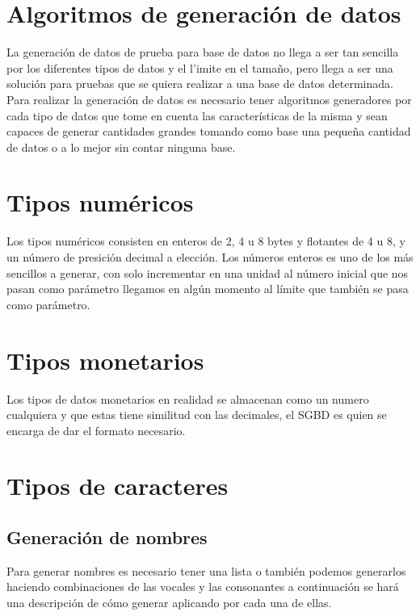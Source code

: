 \section{Algoritmos de generaci\'on de datos}
La generaci\'on de datos de prueba para base de datos no llega a ser tan sencilla por los diferentes tipos de datos y el l'imite en el tama\~no, pero llega a ser una soluci\'on  para pruebas que se quiera realizar a una base de datos determinada. Para realizar la generaci\'on de datos  es necesario tener algoritmos generadores por cada tipo de datos que tome en cuenta las caracter\'isticas de la misma  y sean capaces de generar cantidades grandes tomando como base una peque\~na cantidad de datos o a lo mejor sin contar ninguna base.
\section{Tipos num\'ericos}
Los tipos num\'ericos consisten en enteros de 2, 4 u 8 bytes y flotantes de 4 u 8, y un n\'umero de presici\'on decimal a elecci\'on.
Los n\'umeros enteros es uno de los m\'as sencillos a generar, con solo incrementar en una unidad al n\'umero  inicial que nos pasan como par\'ametro llegamos en alg\'un momento al l\'imite que tambi\'en se pasa como par\'ametro.
\section{Tipos monetarios}
Los tipos de datos monetarios en realidad se almacenan como un numero cualquiera y que estas tiene similitud con las decimales, el SGBD es quien se encarga de dar el formato necesario. 
\section{Tipos de caracteres}
\subsection{Generaci\'on de nombres}
Para generar nombres es necesario tener una lista o tambi\'en podemos generarlos haciendo combinaciones de las vocales y las consonantes a continuaci\'on se har\'a una descripci\'on de c\'omo generar aplicando por cada una de ellas.
